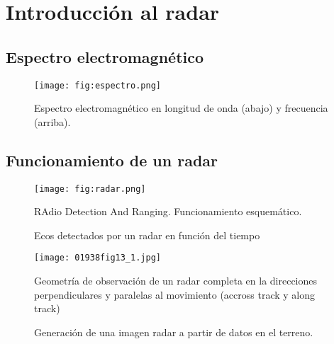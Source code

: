\section{Introducción al radar}
\subsection{Espectro electromagnético}
\begin{frame}{} \vskip0cm
  \begin{figure}
    \centering
    \texttt{[image: fig:espectro.png]}
    \caption{Espectro electromagnético en longitud de onda (abajo) y frecuencia (arriba).}
    \label{}
  \end{figure}
\end{frame}

\subsection{Funcionamiento de un radar}
\begin{frame}{} \vskip0cm
    \begin{figure}
      \centering
      \texttt{[image: fig:radar.png]}
      \caption{RAdio Detection And Ranging. Funcionamiento esquemático.}
      \label{}
    \end{figure}
\end{frame}

\begin{frame}{} \vskip0cm
  \begin{figure}
    \centering
    \caption{Ecos detectados por un radar en función del tiempo}
    \label{}
  \end{figure}
\end{frame}

\begin{frame}{} \vskip0cm
  \begin{figure}
    \centering
    \texttt{[image: 01938fig13\_1.jpg]}
    \caption{Geometría de observación de un radar completa en la direcciones perpendiculares y paralelas al movimiento (accross track y along track)}
    \label{}
  \end{figure}
\end{frame}


\begin{frame}{} \vskip0cm
  \begin{figure}
    \centering
    \caption{Generación de una imagen radar a partir de datos en el terreno.}
    \label{}
  \end{figure}
\end{frame}

